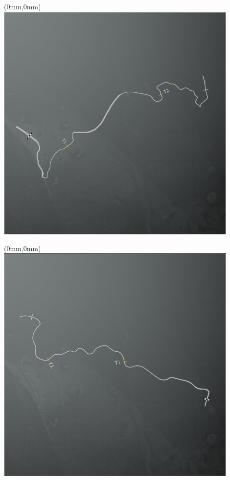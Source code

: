 \null\newpage
\begin{textblock*}{30mm}(0mm,0mm)%
\includegraphics[width=120mm]{TR/2015-05-20_00003.png}
\end{textblock*}
\null\newpage
\begin{textblock*}{30mm}(0mm,0mm)%
\includegraphics[width=120mm]{TR/2015-05-20_00005.png}
\end{textblock*}
